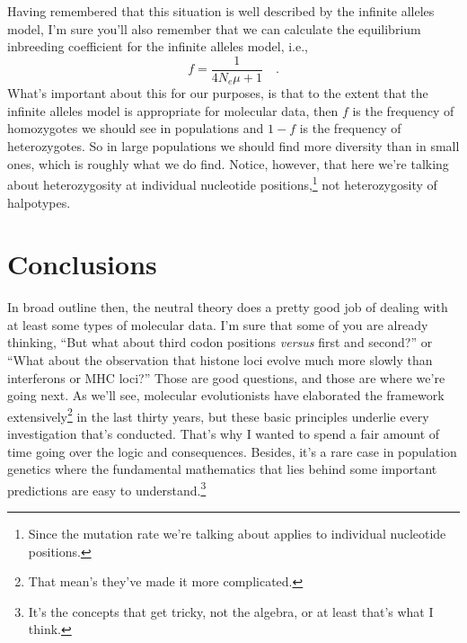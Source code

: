 \documentclass[12pt]{article}
\begin{document}
Having remembered that this situation is well described by the
infinite alleles model, I'm sure you'll also remember that we can
calculate the equilibrium inbreeding coefficient for the infinite
alleles model, i.e.,
\[
f = \frac{1}{4N_e\mu + 1} \quad .
\]
What's important about this for our purposes, is that to the extent
that the infinite alleles model is appropriate for molecular data,
then $f$ is the frequency of homozygotes we should see in populations
and $1-f$ is the frequency of heterozygotes. So in large populations
we should find more diversity than in small ones, which is roughly
what we do find. Notice, however, that here we're talking about
heterozygosity at individual nucleotide positions,\footnote{Since the
  mutation rate we're talking about applies to individual nucleotide
  positions.} not heterozygosity of halpotypes.

\section*{Conclusions}

In broad outline then, the neutral theory does a pretty good job of
dealing with at least some types of molecular data. I'm sure that some
of you are already thinking, ``But what about third codon positions
{\it versus\/} first and second?'' or ``What about the observation
that histone loci evolve much more slowly than interferons or MHC
loci?''  Those are good questions, and those are where we're going
next. As we'll see, molecular evolutionists have elaborated the
framework extensively\footnote{That mean's they've made it more
  complicated.} in the last thirty years, but these basic principles
underlie every investigation that's conducted. That's why I wanted to
spend a fair amount of time going over the logic and
consequences. Besides, it's a rare case in population genetics where
the fundamental mathematics that lies behind some important
predictions are easy to understand.\footnote{It's the concepts that
  get tricky, not the algebra, or at least that's what I think.}




\ccLicense
\end{document}
